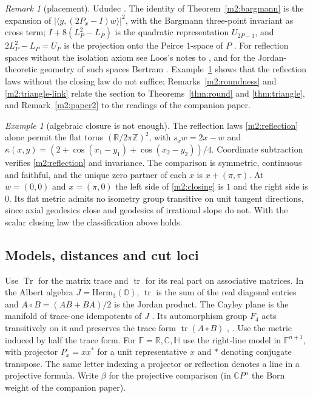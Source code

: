 \documentclass[11pt,reqno]{amsart}
\theoremstyle{definition}
\theoremstyle{remark}
\newtheorem{remark}[theorem]{Remark}
\newtheorem{example}[theorem]{Example}
\numberwithin{equation}{section}
\newcommand{\R}{\mathbb{R}}
\newcommand{\C}{\mathbb{C}}
\newcommand{\HH}{\mathbb{H}}
\newcommand{\Z}{\mathbb{Z}}
\newcommand{\ip}[2]{\langle #1,#2\rangle}
\begin{document}
\begin{remark}[placement]
Ududec \cite{m2:BMU}.  The identity of Theorem~\ref{m2:bargmann} is the expansion of $|\ip y{(2P_x-I)w}|^2$, with the Bargmann three-point
invariant \cite{m2:Bargmann} as cross term; $I+8(L_P^2-L_P)$ is the quadratic representation $U_{2P-1}$, and $2L_P^2-L_P=U_P$ is the
projection onto the Peirce $1$-space of $P$ \cite[Ch.~IV]{m2:FK}.  For reflection spaces without the isolation axiom see Loos's notes to
\cite[Ch.~II]{Loos}, and for the Jordan-theoretic geometry of such spaces Bertram \cite{m2:Bertram}.  Example~\ref{m2:torus} shows that the reflection laws without the
closing law do not suffice; Remarks~\ref{m2:roundness} and \ref{m2:triangle-link} relate the section to Theorems~\ref{thm:round} and
\ref{thm:triangle}, and Remark~\ref{m2:paper2} to the readings of the companion paper.
\end{remark}

\begin{example}[algebraic closure is not enough]\label{m2:torus}
The reflection laws \eqref{m2:reflection} alone permit the flat torus $(\R/2\pi\Z)^2$, with $s_xw=2x-w$ and
$\kappa(x,y)=(2+\cos(x_1-y_1)+\cos(x_2-y_2))/4$.  Coordinate subtraction verifies \eqref{m2:reflection} and invariance.  The comparison is
symmetric, continuous and faithful, and the unique zero partner of each $x$ is $x+(\pi,\pi)$.  At $w=(0,0)$ and $x=(\pi,0)$ the left side
of \eqref{m2:closing} is $1$ and the right side is $0$.  Its flat metric admits no isometry group transitive on unit tangent directions,
since axial geodesics close and geodesics of irrational slope do not.  With the scalar closing law the classification above holds.
\end{example}

\subsection{Models, distances and cut loci}

Use $\operatorname{Tr}$ for the matrix trace and $\operatorname{tr}$ for its real part on associative matrices.  In the Albert algebra
$J=\mathrm{Herm}_3(\mathbb O)$, $\operatorname{tr}$ is the sum of the real diagonal entries and $A\circ B=(AB+BA)/2$ is the Jordan product.
The Cayley plane is the manifold of trace-one idempotents of $J$ \cite[\S3.4]{Baez02}.  Its automorphism group $F_4$ acts transitively on
it and preserves the trace form $\operatorname{tr}(A\circ B)$ \cite[\S\S3.4, 4.2]{Baez02}, \cite{SV00}.  Use the metric induced by half the
trace form.  For $\mathbb F=\R,\C,\HH$ use the right-line model in $\mathbb F^{n+1}$, with projector $P_x=xx^*$ for a unit representative
$x$ and $*$ denoting conjugate transpose.  The same letter indexing a projector or reflection denotes a line in a projective formula.
Write $\beta$ for the projective comparison (in $\C P^n$ the Born weight of the companion paper).
\end{document}
